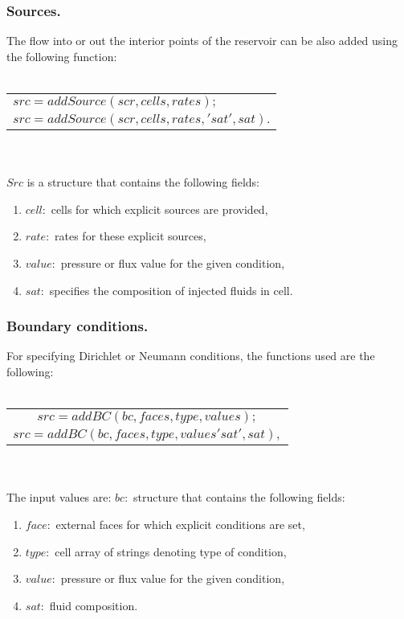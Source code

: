 \documentclass[12pt]{report}
\begin{document}
\subsubsection{Sources.}
The flow into or out the interior points of the reservoir can be also added using the following function:\\\\
\begin{tabular}{|l|}
\hline
 $src=addSource(scr,cells,rates);$\\
 $src=addSource(scr,cells,rates,'sat',sat).$\\
\hline
\end{tabular}
\\\\$Src$ is a structure that contains the following fields:
\begin{enumerate}
 \item $cell:$ cells for which explicit sources are provided,
 \item $rate:$ rates for these explicit sources,
 \item $value:$ pressure or flux value for the given condition,
 \item $sat:$ specifies the composition of injected fluids in cell. 
\end{enumerate}
\subsubsection{Boundary conditions.}
For specifying Dirichlet or Neumann conditions, the functions used are the following:\\\\
\begin{tabular}{|l|}
\hline
 $$src=addBC(bc,faces,type,values);$$\\
 $$src=addBC(bc,faces,type,values'sat',sat),$$\\
\hline 
\end{tabular}
\\\\The input values are:
$bc:$ structure that contains the following fields:
\begin{enumerate}
 \item $face:$ external faces for which explicit conditions are set,
 \item $type:$ cell array of strings denoting type of condition,
 \item $value:$ pressure or flux value for the given condition,
 \item $sat:$ fluid composition.
\end{enumerate}
\end{document}
